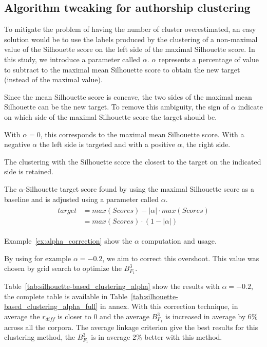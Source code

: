 \subsection{Algorithm tweaking for authorship clustering}

To mitigate the problem of having the number of cluster overestimated, an easy solution would be to use the labels produced by the clustering of a non-maximal value of the Silhouette score on the left side of the maximal Silhouette score.
In this study, we introduce a parameter called $\alpha$.
$\alpha$ represents a percentage of value to subtract to the maximal mean Silhouette score to obtain the new target (instead of the maximal value).

Since the mean Silhouette score is concave, the two sides of the maximal mean Silhouette can be the new target.
To remove this ambiguity, the sign of $\alpha$ indicate on which side of the maximal Silhouette score the target should be.

With $\alpha = 0$, this corresponds to the maximal mean Silhouette score.
With a negative $\alpha$ the left side is targeted and with a positive $\alpha$, the right side.

The clustering with the Silhouette score the closest to the target on the indicated side is retained.

\begin{definition}
  The $\alpha$-Silhouette target score found by using the maximal Silhouette score as a baseline and is adjusted using a parameter called $\alpha$.
  \begin{gather*}
    \begin{aligned}
    target &= max(Scores) - |\alpha| \cdot max(Scores) \\
           &= max(Scores) \cdot (1 - |\alpha|)
    \end{aligned}
  \end{gather*}
\end{definition}

Example~\ref{ex:alpha_correction} show the $\alpha$ computation and usage.

By using for example $\alpha = -0.2$, we aim to correct this overshoot.
This value was chosen by grid search to optimize the $B^3_{F_1}$.

Table~\ref{tab:silhouette-based_clustering_alpha} show the results with $\alpha = -0.2$, the complete table is available in Table~\ref{tab:silhouette-based_clustering_alpha_full} in annex.
With this correction technique, in average the $r_{diff}$ is closer to 0 and the average $B^3_{F_1}$ is increased in average by 6\% across all the corpora.
The average linkage criterion give the best results for this clustering method, the $B^3_{F_1}$ is in average 2\% better with this method.

